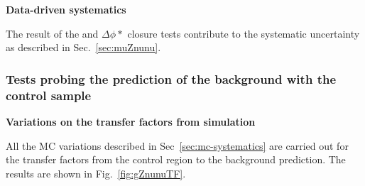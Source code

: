 {\bf Data-driven systematics}

The result of the \alphat and $\Delta\phi *$ closure tests contribute
to the systematic uncertainty as described in Sec.~\ref{sec:muZnunu}.

\subsubsection{Tests probing the prediction of the \znunu
background with the \gj control sample}

{\bf Variations on the transfer factors from simulation}

All the MC variations described in Sec~\ref{sec:mc-systematics} are
carried out for the transfer factors from the \gj control region to
the \znunu background prediction. The results are shown in
Fig.~\ref{fig:gZnunuTF}.

